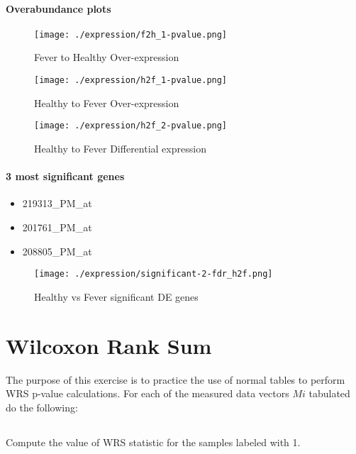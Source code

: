 \documentclass[a4paper]{article}
\begin{document}
\paragraph{Overabundance plots}

\begin{figure}
  \texttt{[image: ./expression/f2h\_1-pvalue.png]}
  \caption{Fever to Healthy Over-expression}
\end{figure}

\begin{figure}
  \texttt{[image: ./expression/h2f\_1-pvalue.png]}
  \caption{Healthy to Fever Over-expression}
\end{figure}

\begin{figure}
  \texttt{[image: ./expression/h2f\_2-pvalue.png]}
  \caption{Healthy to Fever Differential expression}
\end{figure}

\paragraph{3 most significant genes}

\begin{itemize}
  \item 219313\_PM\_at
  \item 201761\_PM\_at
  \item 208805\_PM\_at
\end{itemize}

\begin{figure}
  \texttt{[image: ./expression/significant-2-fdr\_h2f.png]}
  \caption{Healthy vs Fever significant DE genes}
\end{figure}

\clearpage
\section{Wilcoxon Rank Sum}

The purpose of this exercise is to practice the use of normal tables to perform WRS p-value calculations.
For each of the measured data vectors $Mi$ tabulated do the following:

\subsection{}
Compute the value of WRS statistic for the samples labeled with 1.
\end{document}
